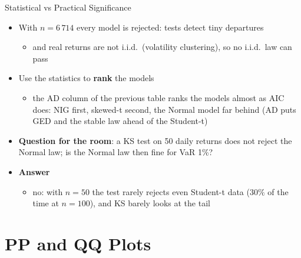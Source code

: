 \begin{frame}{Statistical vs Practical Significance}
\itemsize{\small}
\begin{itemize}
    \item With $n = 6\,714$ every model is rejected: tests detect tiny departures
    \begin{itemize}
        \item and real returns are not i.i.d.\ (volatility clustering), so no i.i.d.\ law can pass
    \end{itemize}
    \item Use the statistics to \textbf{rank} the models
    \begin{itemize}
        \item the AD column of the previous table ranks the models almost as AIC does: NIG first, skewed-t second, the Normal model far behind (AD puts GED and the stable law ahead of the Student-t)
    \end{itemize}
    \item \textbf{Question for the room}: a KS test on 50 daily returns does not reject the Normal law; is the Normal law then fine for VaR 1\%?
    \item \textbf{Answer}
    \begin{itemize}
        \item no: with $n = 50$ the test rarely rejects even Student-t data ($30\%$ of the time at $n = 100$), and KS barely looks at the tail
    \end{itemize}
\end{itemize}
\end{frame}


\section{PP and QQ Plots}


